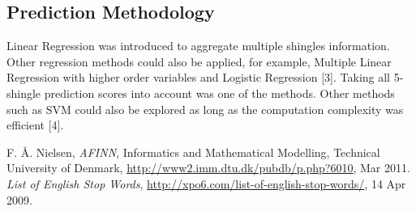 \subsection{Prediction Methodology}
Linear Regression was introduced to aggregate multiple shingles information. Other regression methods could also be applied, for example, Multiple Linear Regression with higher order variables and Logistic Regression [3].  Taking all 5-shingle prediction scores into account was one of the methods. Other methods such as SVM could also be explored as long as the computation complexity was efficient [4].



\begin{thebibliography}{1}
	F. {\AA}. Nielsen, 
	{\em AFINN},
	Informatics and Mathematical Modelling, Technical University of Denmark,
	\url{http://www2.imm.dtu.dk/pubdb/p.php?6010},
	Mar 2011.
	{\em List of English Stop Words},
	\url{http://xpo6.com/list-of-english-stop-words/},
	14 Apr 2009.

%
%
%
%



\end{thebibliography}
